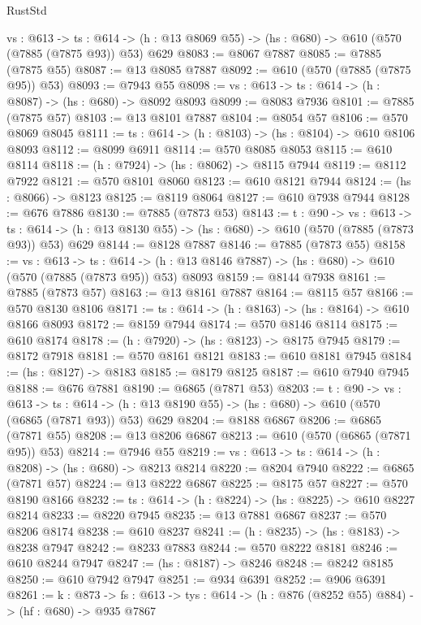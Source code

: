 \begin{lexlean}{RustStd}
\begin{coremodule}
  {vs : @613} ->
  {ts : @614} -> (h : @13 @8069 @55) -> (hs : @680) -> @610 (@570 (@7885 (@7875 @93)) @53) @629
@8083 := @8067 @7887
@8085 := @7885 (@7875 @55)
@8087 := @13 @8085 @7887
@8092 := @610 (@570 (@7885 (@7875 @95)) @53)
@8093 := @7943 @55
@8098 := {vs : @613} -> {ts : @614} -> (h : @8087) -> (hs : @680) -> @8092 @8093
@8099 := @8083 @7936
@8101 := @7885 (@7875 @57)
@8103 := @13 @8101 @7887
@8104 := @8054 @57
@8106 := @570 @8069 @8045
@8111 := {ts : @614} -> (h : @8103) -> (hs : @8104) -> @610 @8106 @8093
@8112 := @8099 @6911
@8114 := @570 @8085 @8053
@8115 := @610 @8114
@8118 := (h : @7924) -> (hs : @8062) -> @8115 @7944
@8119 := @8112 @7922
@8121 := @570 @8101 @8060
@8123 := @610 @8121 @7944
@8124 := (hs : @8066) -> @8123
@8125 := @8119 @8064
@8127 := @610 @7938 @7944
@8128 := @676 @7886
@8130 := @7885 (@7873 @53)
@8143 := {t : @90} ->
  {vs : @613} ->
  {ts : @614} -> (h : @13 @8130 @55) -> (hs : @680) -> @610 (@570 (@7885 (@7873 @93)) @53) @629
@8144 := @8128 @7887
@8146 := @7885 (@7873 @55)
@8158 := {vs : @613} ->
  {ts : @614} -> (h : @13 @8146 @7887) -> (hs : @680) -> @610 (@570 (@7885 (@7873 @95)) @53) @8093
@8159 := @8144 @7938
@8161 := @7885 (@7873 @57)
@8163 := @13 @8161 @7887
@8164 := @8115 @57
@8166 := @570 @8130 @8106
@8171 := {ts : @614} -> (h : @8163) -> (hs : @8164) -> @610 @8166 @8093
@8172 := @8159 @7944
@8174 := @570 @8146 @8114
@8175 := @610 @8174
@8178 := (h : @7920) -> (hs : @8123) -> @8175 @7945
@8179 := @8172 @7918
@8181 := @570 @8161 @8121
@8183 := @610 @8181 @7945
@8184 := (hs : @8127) -> @8183
@8185 := @8179 @8125
@8187 := @610 @7940 @7945
@8188 := @676 @7881
@8190 := @6865 (@7871 @53)
@8203 := {t : @90} ->
  {vs : @613} ->
  {ts : @614} -> (h : @13 @8190 @55) -> (hs : @680) -> @610 (@570 (@6865 (@7871 @93)) @53) @629
@8204 := @8188 @6867
@8206 := @6865 (@7871 @55)
@8208 := @13 @8206 @6867
@8213 := @610 (@570 (@6865 (@7871 @95)) @53)
@8214 := @7946 @55
@8219 := {vs : @613} -> {ts : @614} -> (h : @8208) -> (hs : @680) -> @8213 @8214
@8220 := @8204 @7940
@8222 := @6865 (@7871 @57)
@8224 := @13 @8222 @6867
@8225 := @8175 @57
@8227 := @570 @8190 @8166
@8232 := {ts : @614} -> (h : @8224) -> (hs : @8225) -> @610 @8227 @8214
@8233 := @8220 @7945
@8235 := @13 @7881 @6867
@8237 := @570 @8206 @8174
@8238 := @610 @8237
@8241 := (h : @8235) -> (hs : @8183) -> @8238 @7947
@8242 := @8233 @7883
@8244 := @570 @8222 @8181
@8246 := @610 @8244 @7947
@8247 := (hs : @8187) -> @8246
@8248 := @8242 @8185
@8250 := @610 @7942 @7947
@8251 := @934 @6391
@8252 := @906 @6391
@8261 := {k : @873} ->
  {fs : @613} -> {tys : @614} -> (h : @876 (@8252 @55) @884) -> (hf : @680) -> @935 @7867

\end{coremodule}
\end{lexlean}
